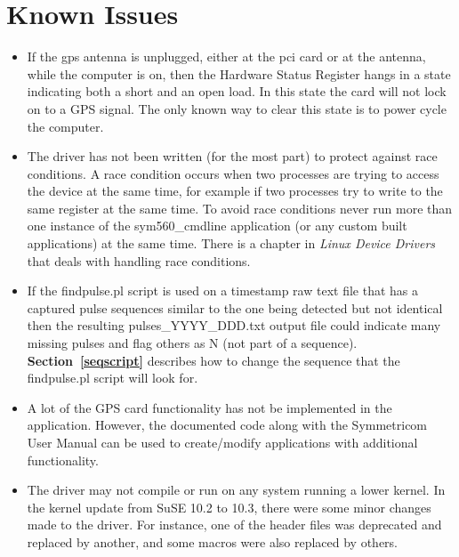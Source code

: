 \documentclass[11pt]{article}
\begin{document}


\section{Known Issues} \label{issues}

\begin{itemize}
 \item If the gps antenna is unplugged, either at the pci card or at the antenna, while the computer is on, then the Hardware Status Register hangs in a state indicating both a short and an open load.  In this state the card will not lock on to a GPS signal. The only known way to clear this state is to power cycle the computer.

 \item The driver has not been written (for the most part) to protect against race conditions.  A race condition occurs when two processes are trying to access the device at the same time, for example if two processes try to write to the same register at the same time.  To avoid race conditions never run more than one instance of the sym560\_cmdline application (or any custom built applications) at the same time.  There is a chapter in \textit{Linux Device Drivers} that deals with handling race conditions.

 \item If the findpulse.pl script is used on a timestamp raw text file that has a captured pulse sequences similar to the one being detected but not identical then the resulting pulses\_YYYY\_DDD.txt output file could indicate many missing pulses and flag others as N (not part of a sequence).  \textbf{Section~\ref{seqscript}} describes how to change the sequence that the findpulse.pl script will look for.

 \item A lot of the GPS card functionality has not be implemented in the application.  However, the documented code along with the Symmetricom User Manual can be used to create/modify applications with additional functionality.

 \item The driver may not compile or run on any system running a lower kernel.  In the kernel update from SuSE 10.2 to 10.3, there were some minor changes made to the driver.  For instance, one of the header files was deprecated and replaced by another, and some macros were also replaced by others.
\end{itemize}
\end{document}
